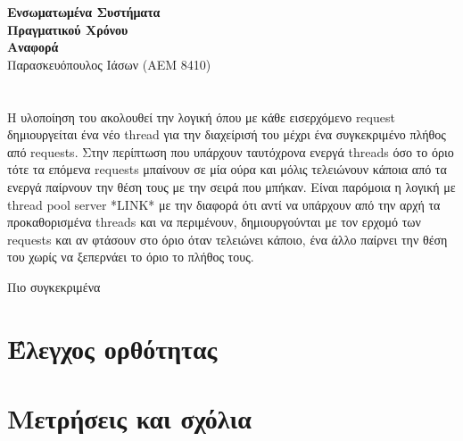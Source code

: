 \documentclass[10p]{report}
\begin{document}
\begin{center}
\textbf{\Large{Ενσωματωμένα Συστήματα \\ Πραγματικού Χρόνου}}\\
\textbf{\large{Αναφορά }} \\
\normalsize{Παρασκευόπουλος Ιάσων (ΑΕΜ 8410)}
\end{center}

\section*{}

Η υλοποίηση του  ακολουθεί την λογική όπου με κάθε εισερχόμενο request 
δημιουργείται ένα νέο thread για την διαχείρισή του μέχρι ένα συγκεκριμένο πλήθος
από requests. Στην περίπτωση που υπάρχουν ταυτόχρονα ενεργά threads όσο το όριο 
τότε τα επόμενα requests μπαίνουν σε μία ούρα και μόλις τελειώνουν κάποια από τα 
ενεργά παίρνουν την θέση τους με την σειρά που μπήκαν. Είναι παρόμοια 
η λογική με thread pool server *LINK* με την διαφορά ότι αντί να υπάρχουν από την αρχή 
τα προκαθορισμένα threads και να περιμένουν, δημιουργούνται με τον ερχομό των requests και 
αν φτάσουν στο όριο όταν τελειώνει κάποιο, ένα άλλο παίρνει την θέση του χωρίς να 
ξεπερνάει το όριο το πλήθος τους. 

Πιο συγκεκριμένα 
 
\section*{}

\section*{Έλεγχος ορθότητας}

\section*{Μετρήσεις και σχόλια}
\end{document}

